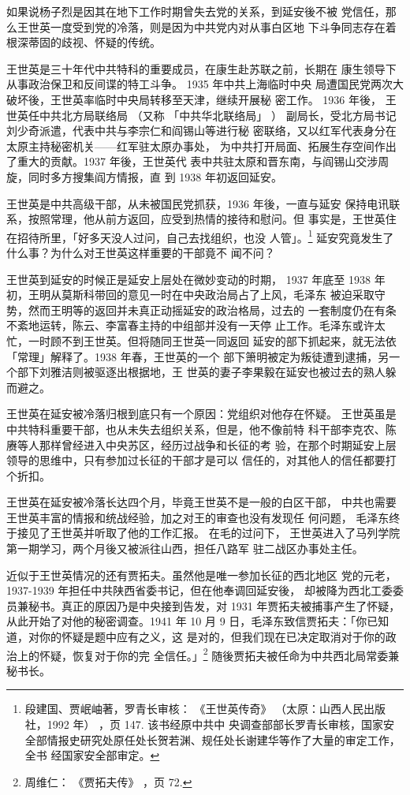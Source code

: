 如果说杨子烈是因其在地下工作时期曾失去党的关系，到延安後不被
党信任，那么王世英一度受到党的冷落，则是因为中共党内对从事白区地
下斗争同志存在着根深蒂固的歧视、怀疑的传统。

王世英是三十年代中共特科的重要成员，在康生赴苏联之前，长期在
康生领导下从事政治保卫和反间谍的特工斗争。
1935 年中共上海临时中央
局遭国民党两次大破坏後，王世英率临时中央局转移至天津，继续开展秘
密工作。
1936 年後，
王世英任中共北方局联络局
（又称
「中共华北联络局」
）
副局长，受北方局书记刘少奇派遣，代表中共与李宗仁和阎锡山等进行秘
密联络，又以红军代表身分在太原主持秘密机关——红军驻太原办事处，
为中共打开局面、拓展生存空间作出了重大的贡献。1937 年後，王世英代
表中共驻太原和晋东南，与阎锡山交涉周旋，同时多方搜集阎方情报，直
到 1938 年初返回延安。

王世英是中共高级干部，从未被国民党抓获，1936 年後，一直与延安
保持电讯联系，按照常理，他从前方返回，应受到热情的接待和慰问。但
事实是，王世英住在招待所里，「好多天没人过问，自己去找组织，也没
人管」。\footnote{段建国、贾岷岫著，罗青长审核：
《王世英传奇》
（太原：山西人民出版社，1992 年）
，页 147. 该书经原中共中
央调查部部长罗青长审核，国家安全部情报史研究处原任处长贺若渊、规任处长谢建华等作了大量的审定工作，全书
经国家安全部审定。
} 延安究竟发生了什么事？为什么对王世英这样重要的干部竟不
闻不问？

王世英到延安的时候正是延安上层处在微妙变动的时期，
1937 年底至
1938 年初，王明从莫斯科带回的意见一时在中央政治局占了上风，毛泽东
被迫采取守势，然而王明等的返回并未真正动摇延安的政治格局，过去的
一套制度仍在有条不紊地运转，陈云、李富春主持的中组部并没有一天停
止工作。毛泽东或许太忙，一时顾不到王世英。但将随同王世英一同返回
延安的部下抓起来，就无法依「常理」解释了。1938 年春，王世英的一个
部下箫明被定为叛徒遭到逮捕，另一个部下刘雅洁则被驱逐出根据地，王
世英的妻子李果毅在延安也被过去的熟人躲而避之。

王世英在延安被冷落归根到底只有一个原因：党组织对他存在怀疑。
王世英虽是中共特科重要干部，也从未失去组织关系，但是，他不像前特
科干部李克农、陈赓等人那样曾经进入中央苏区，经历过战争和长征的考
验，在那个时期延安上层领导的思维中，只有参加过长征的干部才是可以
信任的，对其他人的信任都要打个折扣。

王世英在延安被冷落长达四个月，毕竟王世英不是一般的白区干部，
中共也需要王世英丰富的情报和统战经验，加之对王的审查也没有发现任
何问题，
毛泽东终于接见了王世英并听取了他的工作汇报。
在毛的过问下，
王世英进入了马列学院第一期学习，两个月後又被派往山西，担任八路军
驻二战区办事处主任。

近似于王世英情况的还有贾拓夫。虽然他是唯一参加长征的西北地区
党的元老，1937-1939 年担任中共陕西省委书记，但在他奉调回延安後，
却被降为西北工委委员兼秘书。真正的原因乃是中央接到告发，对 1931
年贾拓夫被捕事产生了怀疑，从此开始了对他的秘密调查。1941 年 10 月
9 日，毛泽东致信贾拓夫：「你已知道，对你的怀疑是题中应有之义，这
是对的，但我们现在已决定取消对于你的政治上的怀疑，恢复对于你的完
全信任。」\footnote{周维仁：
《贾拓夫传》
，页 72. } 随後贾拓夫被任命为中共西北局常委兼秘书长。


